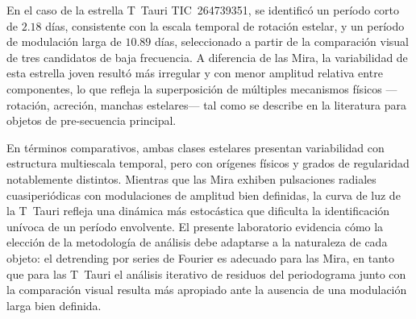 \documentclass[letterpaper,12pt]{extarticle}
\begin{document}
En el caso de la estrella T~Tauri TIC~264739351, se identificó un período corto de $2.18$ días, consistente con la escala temporal de rotación estelar, y un período de modulación larga de $10.89$ días, seleccionado a partir de la comparación visual de tres candidatos de baja frecuencia. A diferencia de las Mira, la variabilidad de esta estrella joven resultó más irregular y con menor amplitud relativa entre componentes, lo que refleja la superposición de múltiples mecanismos físicos —rotación, acreción, manchas estelares— tal como se describe en la literatura para objetos de pre-secuencia principal.

En términos comparativos, ambas clases estelares presentan variabilidad con estructura multiescala temporal, pero con orígenes físicos y grados de regularidad notablemente distintos. Mientras que las Mira exhiben pulsaciones radiales cuasiperiódicas con modulaciones de amplitud bien definidas, la curva de luz de la T~Tauri refleja una dinámica más estocástica que dificulta la identificación unívoca de un período envolvente. El presente laboratorio evidencia cómo la elección de la metodología de análisis debe adaptarse a la naturaleza de cada objeto: el detrending por series de Fourier es adecuado para las Mira, en tanto que para las T~Tauri el análisis iterativo de residuos del periodograma junto con la comparación visual resulta más apropiado ante la ausencia de una modulación larga bien definida.

\footnotesize


\end{document}
